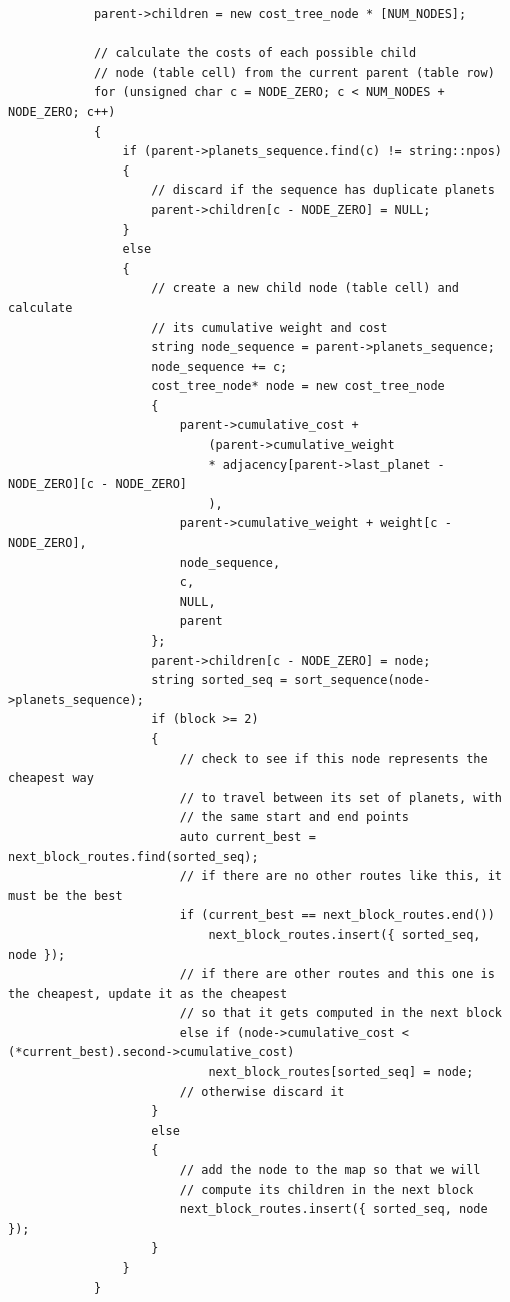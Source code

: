 \documentclass[
]{article}
\begin{document}
\begin{verbatim}
            parent->children = new cost_tree_node * [NUM_NODES];

            // calculate the costs of each possible child 
            // node (table cell) from the current parent (table row)
            for (unsigned char c = NODE_ZERO; c < NUM_NODES + NODE_ZERO; c++)
            {
                if (parent->planets_sequence.find(c) != string::npos)
                {
                    // discard if the sequence has duplicate planets
                    parent->children[c - NODE_ZERO] = NULL;
                }
                else
                {
                    // create a new child node (table cell) and calculate 
                    // its cumulative weight and cost
                    string node_sequence = parent->planets_sequence;
                    node_sequence += c;
                    cost_tree_node* node = new cost_tree_node
                    {
                        parent->cumulative_cost + 
                            (parent->cumulative_weight 
                            * adjacency[parent->last_planet - NODE_ZERO][c - NODE_ZERO]
                            ),
                        parent->cumulative_weight + weight[c - NODE_ZERO],
                        node_sequence,
                        c,
                        NULL,
                        parent
                    };
                    parent->children[c - NODE_ZERO] = node;
                    string sorted_seq = sort_sequence(node->planets_sequence);
                    if (block >= 2)
                    {
                        // check to see if this node represents the cheapest way 
                        // to travel between its set of planets, with
                        // the same start and end points
                        auto current_best = next_block_routes.find(sorted_seq);
                        // if there are no other routes like this, it must be the best
                        if (current_best == next_block_routes.end())
                            next_block_routes.insert({ sorted_seq, node });
                        // if there are other routes and this one is the cheapest, update it as the cheapest
                        // so that it gets computed in the next block
                        else if (node->cumulative_cost < (*current_best).second->cumulative_cost) 
                            next_block_routes[sorted_seq] = node;
                        // otherwise discard it
                    }
                    else
                    {
                        // add the node to the map so that we will 
                        // compute its children in the next block
                        next_block_routes.insert({ sorted_seq, node });
                    }
                }
            }


\end{verbatim}
\end{document}
